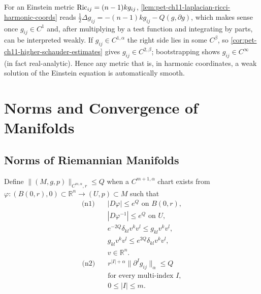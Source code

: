 \begin{remark}
  \label{rem:pet-ch11-einstein-harmonic-regularity-bootstrap}
  For an Einstein metric $\operatorname{Ric}_{ij}=(n-1)kg_{ij}$,
  \cref{lem:pet-ch11-laplacian-ricci-harmonic-coords} reads
  $\tfrac12\Delta g_{ij}=-(n-1)kg_{ij}-Q(g,\partial g)$, which makes sense
  once $g_{ij}\in C^1$ and, after multiplying by a test function and
  integrating by parts, can be interpreted weakly. If $g_{ij}\in C^{1,\alpha}$
  the right side lies in some $C^\beta$, so \cref{cor:pet-ch11-higher-schauder-estimates}
  gives $g_{ij}\in C^{2,\beta}$; bootstrapping shows $g_{ij}\in C^\infty$
  (in fact real-analytic). Hence any metric that is, in harmonic coordinates,
  a weak solution of the Einstein equation is automatically smooth.
\end{remark}

\section{Norms and Convergence of Manifolds}

\subsection{Norms of Riemannian Manifolds}

\begin{definition}
  \label{def:pet-ch11-cmalpha-norm-pointed}
  Define $\|(M,g,p)\|_{C^{m,\alpha},r}\le Q$ when a $C^{m+1,\alpha}$ chart
  exists from $\varphi:(B(0,r),0)\subset\mathbb{R}^n\to(U,p)\subset M$ such
  that
  \begin{equation}
    \begin{aligned}
      \text{(n1)}\quad
      &|D\varphi|\le e^Q\text{ on }B(0,r),\\
      &|D\varphi^{-1}|\le e^Q\text{ on }U,\\
      &e^{-2Q}\delta_{kl}v^kv^l\le g_{kl}v^kv^l,\\
      &g_{kl}v^kv^l\le e^{2Q}\delta_{kl}v^kv^l,\\
      &v\in\mathbb{R}^n.
    \end{aligned}
  \end{equation}
  \begin{equation}
    \begin{aligned}
      \text{(n2)}\quad
      &r^{|I|+\alpha}\|\partial^Ig_{ij}\|_\alpha\le Q\\
      &\text{for every multi-index }I,\\
      &0\le|I|\le m.
    \end{aligned}
  \end{equation}
\end{definition}

